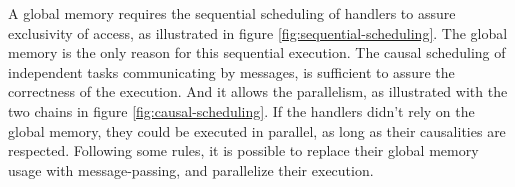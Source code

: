 
\begin{figure}%
  \centering{}%
\end{figure}

A global memory requires the sequential scheduling of handlers to assure exclusivity of access, as illustrated in figure \ref{fig:sequential-scheduling}. %
The global memory is the only reason for this sequential execution.
The causal scheduling of independent tasks communicating by messages, is sufficient to assure the correctness of the execution.
And it allows the parallelism, as illustrated with the two chains in figure \ref{fig:causal-scheduling}.
If the handlers didn't rely on the global memory, they could be executed in parallel, as long as their causalities are respected.
Following some rules, it is possible to replace their global memory usage with message-passing, and parallelize their execution.

